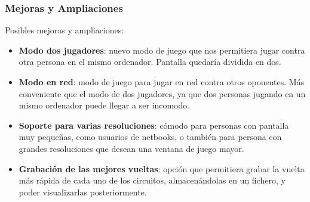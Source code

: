 \begin{frame}
    \frametitle{Mejoras y Ampliaciones}

        \begin{block}{Posibles mejoras y ampliaciones:}
            \begin{itemize}
                \item \textbf{Modo dos jugadores}:  nuevo modo de juego que nos permitiera jugar contra otra
                persona en el mismo ordenador. Pantalla quedaría dividida en dos.

                \item \textbf{Modo en red}: modo de juego para jugar en red contra otros oponentes. 
                Más conveniente que el modo de dos jugadores, ya 
                que dos personas jugando en un mismo ordenador puede llegar a ser incomodo.
                
                \item \textbf{Soporte para varias resoluciones}: cómodo
                para personas con pantalla muy pequeñas, como usuarios de netbooks, o
                también para persona con grandes resoluciones que desean una ventana de juego mayor.
                
                \item \textbf{Grabación de las mejores vueltas}: opción que permitiera grabar la vuelta
                más rápida de cada uno de los circuitos, almacenándolas en un fichero, y poder visualizarlas
                posteriormente.
                
            \end{itemize}
        \end{block}
        
\end{frame}
